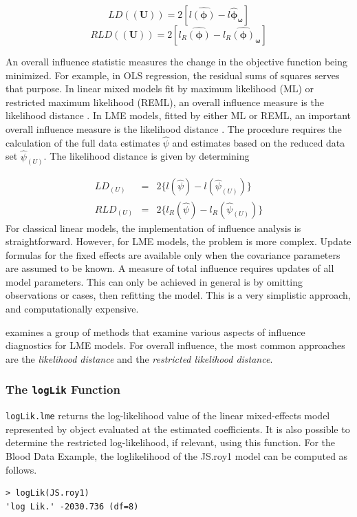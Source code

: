 \documentclass[Main.tex]{subfiles}
\begin{document}
\[  LD(\boldsymbol{(U)})= 2[l\boldsymbol{\hat{(\phi)}} - l\boldsymbol{\hat{\phi}_\omega} ] \]
\[  RLD(\boldsymbol{(U)})= 2[ l_R\boldsymbol{\hat{(\phi)}} - l_R\boldsymbol{\hat{(\phi)}_\omega} ] \]


An overall influence statistic measures the change in the objective function being minimized. For example, in
OLS regression, the residual sums of squares serves that purpose. In linear mixed models fit by
 maximum likelihood (ML) or  restricted maximum likelihood (REML), an overall influence measure is the  likelihood distance \citep{cook}. In LME models, fitted by either ML or REML, an important overall
 influence measure is the likelihood distance \citep{cook82}. The  procedure requires the calculation of the full data estimates
 $\hat{\psi}$ and estimates based on the reduced data set  $\hat{\psi}_{(U)}$. The likelihood distance is given by
 determining
 
 
 \begin{eqnarray}
 LD_{(U)} &=& 2\{l(\hat{\psi}) - l( \hat{\psi}_{(U)}) \}\\
 RLD_{(U)} &=& 2\{l_{R}(\hat{\psi}) - l_{R}(\hat{\psi}_{(U)})\}
 \end{eqnarray}
For classical linear models, the implementation of influence analysis is straightforward.
However, for LME models, the problem is more complex. Update formulas for the fixed effects are available only when the covariance parameters are assumed to be known. A measure of total influence requires updates of all model parameters. This can only be achieved in general is by omitting observations or cases, then refitting the model. This is a very simplistic approach, and computationally expensive.

\citet{west} examines a group of methods that examine various aspects of influence diagnostics for LME models.
For overall influence, the most common approaches are the \textit{likelihood distance} and the \textit{restricted likelihood distance}.

\subsubsection{The \texttt{logLik} Function}
\texttt{logLik.lme} returns the log-likelihood value of the linear mixed-effects model represented by object evaluated at the estimated coefficients. It is also possible to determine the restricted log-likelihood, if relevant, using this function. For the Blood Data Example,  the loglikelihood of the JS.roy1 model can be computed as follows.
\begin{framed}
\begin{verbatim}
> logLik(JS.roy1)
'log Lik.' -2030.736 (df=8)
\end{verbatim}
\end{framed}
\newpage
\end{document}
